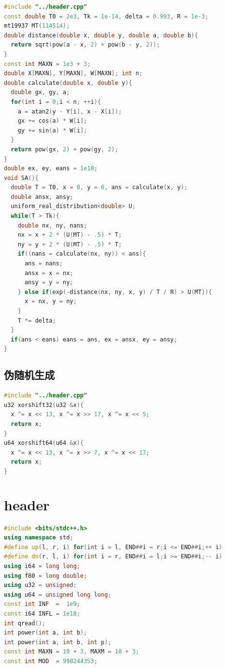 \documentclass[10pt]{ctexart}
\begin{document}
\begin{multicols}{3}
\begin{lstlisting}[language={C++}]
#include "../header.cpp"
const double T0 = 2e3, Tk = 1e-14, delta = 0.993, R = 1e-3;
mt19937 MT(114514);
double distance(double x, double y, double a, double b){
  return sqrt(pow(a - x, 2) + pow(b - y, 2));
}
const int MAXN = 1e3 + 3;
double X[MAXN], Y[MAXN], W[MAXN]; int n;
double calculate(double x, double y){
  double gx, gy, a;
  for(int i = 0;i < n; ++i){
    a = atan2(y - Y[i], x - X[i]);
    gx += cos(a) * W[i];
    gy += sin(a) * W[i];
  }
  return pow(gx, 2) + pow(gy, 2);
}
double ex, ey, eans = 1e18;
void SA(){
  double T = T0, x = 0, y = 0, ans = calculate(x, y);
  double ansx, ansy;
  uniform_real_distribution<double> U;
  while(T > Tk){
    double nx, ny, nans;
    nx = x + 2 * (U(MT) - .5) * T;
    ny = y + 2 * (U(MT) - .5) * T;
    if((nans = calculate(nx, ny)) < ans){
      ans = nans;
      ansx = x = nx;
      ansy = y = ny;
    } else if(exp(-distance(nx, ny, x, y) / T / R) > U(MT)){
      x = nx, y = ny;
    }
    T *= delta;
  }
  if(ans < eans) eans = ans, ex = ansx, ey = ansy;
}
\end{lstlisting}

    \subsection{伪随机生成}\label{ux4f2aux968fux673aux751fux6210}

\begin{lstlisting}[language={C++}]
#include "../header.cpp"
u32 xorshift32(u32 &x){
  x ^= x << 13, x ^= x >> 17, x ^= x << 5;
  return x;
}
u64 xorshift64(u64 &x){
  x ^= x << 13, x ^= x >> 7, x ^= x << 17;
  return x;
}
\end{lstlisting}

    \section{header}\label{header}

\begin{lstlisting}[language={C++}]
#include <bits/stdc++.h>
using namespace std;
#define up(l, r, i) for(int i = l, END##i = r;i <= END##i;++ i)
#define dn(r, l, i) for(int i = r, END##i = l;i >= END##i;-- i)
using i64 = long long;
using f80 = long double;
using u32 = unsigned;
using u64 = unsigned long long;
const int INF  =  1e9;
const i64 INFL = 1e18;
int qread();
int power(int a, int b);
int power(int a, int b, int p);
const int MAXN = 10 + 3, MAXM = 10 + 3;
const int MOD  = 998244353;
\end{lstlisting}

\end{multicols}
\end{document}
